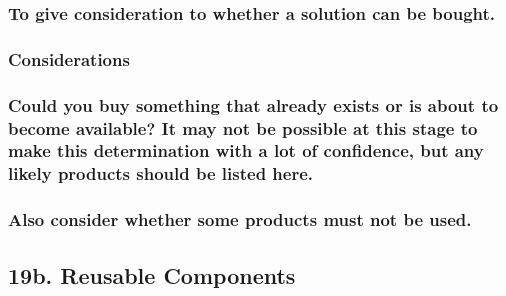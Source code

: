 \documentclass[
]{article}
\begin{document}
\hypertarget{to-give-consideration-to-whether-a-solution-can-be-bought.}{%
\subsubsection{\texorpdfstring{To give consideration to whether a
solution can be bought.
}{To give consideration to whether a solution can be bought. }}\label{to-give-consideration-to-whether-a-solution-can-be-bought.}}

\hypertarget{considerations-45}{%
\subsubsection{Considerations}\label{considerations-45}}

\hypertarget{could-you-buy-something-that-already-exists-or-is-about-to-become-available-it-may-not-be-possible-at-this-stage-to-make-this-determination-with-a-lot-of-confidence-but-any-likely-products-should-be-listed-here.}{%
\subsubsection{\texorpdfstring{Could you buy something that already
exists or is about to become available? It may not be possible at this
stage to make this determination with a lot of confidence, but any
likely products should be listed here.
}{Could you buy something that already exists or is about to become available? It may not be possible at this stage to make this determination with a lot of confidence, but any likely products should be listed here. }}\label{could-you-buy-something-that-already-exists-or-is-about-to-become-available-it-may-not-be-possible-at-this-stage-to-make-this-determination-with-a-lot-of-confidence-but-any-likely-products-should-be-listed-here.}}

\hypertarget{also-consider-whether-some-products-must-not-be-used.}{%
\subsubsection{\texorpdfstring{Also consider whether some products must
not be used.
}{Also consider whether some products must not be used. }}\label{also-consider-whether-some-products-must-not-be-used.}}

\hypertarget{b.-reusable-components}{%
\subsection{19b. Reusable Components}\label{b.-reusable-components}}
\end{document}
